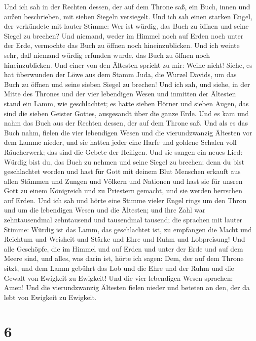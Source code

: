  Und ich sah in der Rechten dessen, der auf dem Throne
saß, ein Buch, innen und außen beschrieben, mit sieben Siegeln
versiegelt.  Und ich sah einen starken Engel, der
verkündete mit lauter Stimme: Wer ist würdig, das Buch zu öffnen und
seine Siegel zu brechen?  Und niemand, weder im Himmel
noch auf Erden noch unter der Erde, vermochte das Buch zu öffnen noch
hineinzublicken.  Und ich weinte sehr, daß niemand würdig
erfunden wurde, das Buch zu öffnen noch hineinzublicken. 
Und einer von den Ältesten spricht zu mir: Weine nicht! Siehe, es hat
überwunden der Löwe aus dem Stamm Juda, die Wurzel Davids, um das Buch
zu öffnen und seine sieben Siegel zu brechen!  Und ich
sah, und siehe, in der Mitte des Thrones und der vier lebendigen Wesen
und inmitten der Ältesten stand ein Lamm, wie geschlachtet; es hatte
sieben Hörner und sieben Augen, das sind die sieben Geister Gottes,
ausgesandt über die ganze Erde.  Und es kam und nahm das
Buch aus der Rechten dessen, der auf dem Throne saß.  Und
als es das Buch nahm, fielen die vier lebendigen Wesen und die
vierundzwanzig Ältesten vor dem Lamme nieder, und sie hatten jeder eine
Harfe und goldene Schalen voll Räucherwerk; das sind die Gebete der
Heiligen.  Und sie sangen ein neues Lied: Würdig bist du,
das Buch zu nehmen und seine Siegel zu brechen; denn du bist
geschlachtet worden und hast für Gott mit deinem Blut Menschen erkauft
aus allen Stämmen und Zungen und Völkern und Nationen 
und hast sie für unsren Gott zu einem Königreich und zu Priestern
gemacht, und sie werden herrschen auf Erden.  Und ich sah
und hörte eine Stimme vieler Engel rings um den Thron und um die
lebendigen Wesen und die Ältesten; und ihre Zahl war zehntausendmal
zehntausend und tausendmal tausend;  die sprachen mit
lauter Stimme: Würdig ist das Lamm, das geschlachtet ist, zu empfangen
die Macht und Reichtum und Weisheit und Stärke und Ehre und Ruhm und
Lobpreisung!  Und alle Geschöpfe, die im Himmel und auf
Erden und unter der Erde und auf dem Meere sind, und alles, was darin
ist, hörte ich sagen: Dem, der auf dem Throne sitzt, und dem Lamm
gebührt das Lob und die Ehre und der Ruhm und die Gewalt von Ewigkeit zu
Ewigkeit!  Und die vier lebendigen Wesen sprachen: Amen!
Und die vierundzwanzig Ältesten fielen nieder und beteten an den, der da
lebt von Ewigkeit zu Ewigkeit.

\hypertarget{section-5}{%
\section{6}\label{section-5}}

